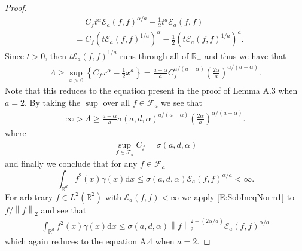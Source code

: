 \documentclass[12pt]{report}
\theoremstyle{plain}
\theoremstyle{definition}
\numberwithin{equation}{section}
\newcommand{\R}{\mathbb{R}}
\newcommand{\Norm}[1]{\left\|  #1   \right\|}
\newcommand{\ud}{\ensuremath{ \mathrm{d} }}
\begin{document}
\begin{proof}
\begin{align*}
	& = C_f t^{\alpha} \mathcal{E}_a(f,f)^{\alpha/a} - \frac{1}{2}t^a \mathcal{E}_a(f,f) \\
	& = C_f \left(t\mathcal{E}_a(f,f)^{1/a}\right)^\alpha - \frac{1}{2} \left( t \mathcal{E}_a(f,f)^{1/a}\right)^a.
	\end{align*}
	Since $t>0$, then $ t\mathcal{E}_a(f,f)^{1/a}$ runs through all of $\R_+$ and thus we have that
	\begin{align*}
	\Lambda \ge \sup_{x>0} \left\{ C_fx^\alpha - \frac{1}{2}x^a \right\} = \frac{a-\alpha}{a}C_f^{a/(a-\alpha)}\left(\frac{2\alpha }{a}\right)^{\alpha/(a-\alpha)}.
	\end{align*}
	Note that this reduces to the equation present in the proof of Lemma A.3 \cite{chen:12:quenched} when
	$a=2$. By taking the $\sup$ over all $f\in \mathcal{F}_a$ we see that
	\begin{align*}
	\infty > \Lambda \ge \frac{a-\alpha}{a}\sigma(a,d,\alpha)^{a/(a-\alpha)}\left(\frac{2\alpha }{a}\right)^{\alpha/(a-\alpha)}.
	\end{align*}
	where
	\begin{align*}
	\sup_{f\in \mathcal{F}_a} C_f = \sigma(a, d,\alpha)
	\end{align*}
	and finally we conclude that for any $f\in \mathcal{F}_a$
	\begin{equation} \label{E:SobIneqNorm1}
	\int_{\R^d} f^2(x) \gamma(x)\ud x \le \sigma(a,d,\alpha) \mathcal{E}_a(f,f)^{\alpha/a} < \infty.
	\end{equation}
	For arbitrary $f\in L^2(\R^2)$ with $\mathcal{E}_a(f,f) < \infty$ we apply \eqref{E:SobIneqNorm1}
	to $f/\Norm{f}_2$ and see that
	\begin{align*}
	\int_{\R^d} f^2(x) \gamma(x) \ud x \le \sigma(a,d,\alpha) \Norm{f}_2^{2-(2\alpha/a)} \mathcal{E}_a(f,f)^{\alpha/a}
	\end{align*}
	which again reduces to the equation A.4 \cite{chen:12:quenched} when $a=2$.
\end{proof}
\end{document}
